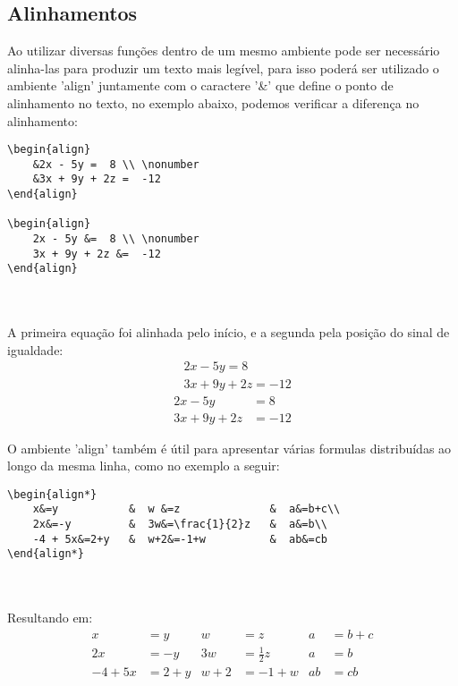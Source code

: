 \documentclass[12pt,a4paper]{article}
\begin{document}
\subsection{Alinhamentos}
Ao utilizar diversas funções dentro de um mesmo ambiente pode ser necessário alinha-las para produzir um texto mais legível, para isso poderá ser utilizado o ambiente 'align' juntamente com o caractere '\&' que define o ponto de alinhamento no texto, no exemplo abaixo, podemos verificar a diferença no alinhamento:

\begin{BVerbatim}
\begin{align}
	&2x - 5y =  8 \\ \nonumber
	&3x + 9y + 2z =  -12 
\end{align}

\begin{align}
	2x - 5y &=  8 \\ \nonumber
	3x + 9y + 2z &=  -12
\end{align}
\end{BVerbatim}
\\
\\
A primeira equação foi alinhada pelo início, e a segunda pela posição do sinal de igualdade:
\begin{align}
	&2x - 5y =  8 \\ \nonumber
	&3x + 9y + 2z =  -12 
\end{align}
\begin{align}
	2x - 5y &=  8 \\ \nonumber
	3x + 9y + 2z &=  -12
\end{align}

O ambiente 'align' também é útil para apresentar várias formulas distribuídas ao longo da mesma linha, como no exemplo a seguir:

\begin{BVerbatim}
\begin{align*}
	x&=y           &  w &=z              &  a&=b+c\\
	2x&=-y         &  3w&=\frac{1}{2}z   &  a&=b\\
	-4 + 5x&=2+y   &  w+2&=-1+w          &  ab&=cb
\end{align*}
\end{BVerbatim}
\\
\\
Resultando em: 
\begin{align*}
	x&=y           &  w &=z              &  a&=b+c\\
	2x&=-y         &  3w&=\frac{1}{2}z   &  a&=b\\
	-4 + 5x&=2+y   &  w+2&=-1+w          &  ab&=cb
\end{align*}
\end{document}
